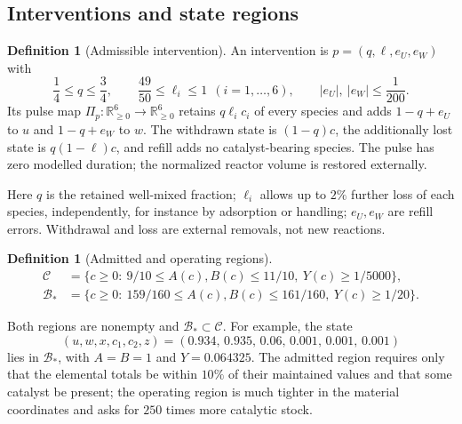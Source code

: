 \documentclass[11pt,a4paper]{article}
\theoremstyle{plain}
\theoremstyle{definition}
\newtheorem{definition}[theorem]{Definition}
\theoremstyle{remark}
\newcommand{\R}{\mathbb R}
\newcommand{\Adm}{\mathcal C}
\newcommand{\Bstar}{\mathcal B_*}
\newcommand{\Pulse}{\Pi}
\begin{document}
\subsection{Interventions and state regions}\label{sec:pulse}
\begin{definition}[Admissible intervention]\label{def:pulse}
An intervention is $p=(q,\ell,e_U,e_W)$ with
\begin{equation}\label{eq:pulsebounds}
\frac14\le q\le\frac34,\qquad \frac{49}{50}\le\ell_i\le1\ \ (i=1,\dots,6),\qquad |e_U|,\ |e_W|\le\frac1{200}.
\end{equation}
Its pulse map $\Pulse_p:\R^6_{\ge0}\to\R^6_{\ge0}$ retains $q\ell_ic_i$ of every species and adds $1-q+e_U$ to $u$ and $1-q+e_W$ to $w$. The withdrawn state is $(1-q)c$, the additionally lost state is $q(1-\ell)c$, and refill adds no catalyst-bearing species. The pulse has zero modelled duration; the normalized reactor volume is restored externally.
\end{definition}
Here $q$ is the retained well-mixed fraction; $\ell_i$ allows up to $2\%$ further loss of each species, independently, for instance by adsorption or handling; $e_U,e_W$ are refill errors. Withdrawal and loss are external removals, not new reactions.

\begin{definition}[Admitted and operating regions]\label{def:regions}
\begin{align}
\Adm&=\{c\ge0:\ 9/10\le A(c),B(c)\le11/10,\ Y(c)\ge1/5000\},\label{eq:C}\\
\Bstar&=\{c\ge0:\ 159/160\le A(c),B(c)\le161/160,\ Y(c)\ge1/20\}.\label{eq:B}
\end{align}
\end{definition}
Both regions are nonempty and $\Bstar\subset\Adm$. For example, the state
\begin{equation}\label{eq:example}
(u,w,x,c_1,c_2,z)=(0.934,\,0.935,\,0.06,\,0.001,\,0.001,\,0.001)
\end{equation}
lies in $\Bstar$, with $A=B=1$ and $Y=0.064325$. The admitted region requires only that the elemental totals be within $10\%$ of their maintained values and that some catalyst be present; the operating region is much tighter in the material coordinates and asks for $250$ times more catalytic stock.
\end{document}

